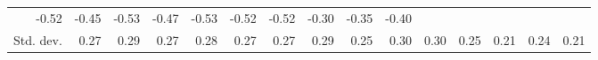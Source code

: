 \begin{tabular}{lllllllllllllll}
  \multicolumn{1}{r}{-0.52} &
  \multicolumn{1}{r}{-0.45} &
  \multicolumn{1}{r}{-0.53} &
  \multicolumn{1}{r}{-0.47} &
  \multicolumn{1}{r}{-0.53} &
  \multicolumn{1}{r}{-0.52} &
  \multicolumn{1}{r}{-0.52} &
  \multicolumn{1}{r}{-0.30} &
  \multicolumn{1}{r}{-0.35} &
  \multicolumn{1}{r}{-0.40} \\
\multicolumn{1}{l}{\hspace{2em}Std. dev.} &
  \multicolumn{1}{|r}{0.27} &
  \multicolumn{1}{r}{0.29} &
  \multicolumn{1}{r}{0.27} &
  \multicolumn{1}{r}{0.28} &
  \multicolumn{1}{r}{0.27} &
  \multicolumn{1}{r}{0.27} &
  \multicolumn{1}{r}{0.29} &
  \multicolumn{1}{r}{0.25} &
  \multicolumn{1}{r}{0.30} &
  \multicolumn{1}{r}{0.30} &
  \multicolumn{1}{r}{0.25} &
  \multicolumn{1}{r}{0.21} &
  \multicolumn{1}{r}{0.24} &
  \multicolumn{1}{r}{0.21} \\
\cline{1-15}
\end{tabular}

